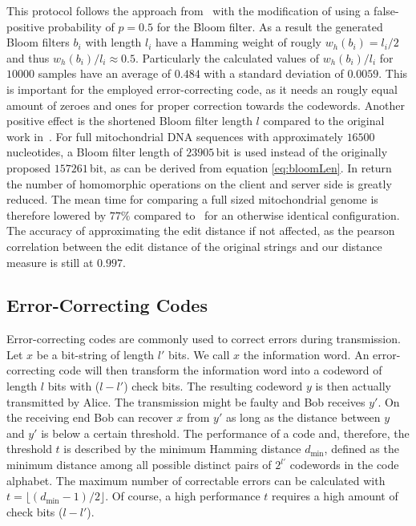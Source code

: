 \documentclass{llncs}
\begin{document}
This protocol follows the approach from~\cite{BecKer12} with the modification of using a false-positive probability of $p=0.5$ for the Bloom filter.
As a result the generated Bloom filters $b_i$ with length $l_i$ have a Hamming weight of rougly $w_h(b_i) = l_i/2$ and thus $w_h(b_i)/l_i \approx 0.5$.
Particularly the calculated values of $w_h(b_i)/l_i$ for $10000$ samples have an average of $0.484$ with a standard deviation of $0.0059$.
This is important for the employed error-correcting code, as it needs an rougly equal amount of zeroes and ones for proper correction towards the codewords.
Another positive effect is the shortened Bloom filter length $l$ compared to the original work in~\cite{BecKer12}.
For full mitochondrial DNA sequences with approximately $16500$ nucleotides, a Bloom filter length of $23905$\,bit is used instead of the originally proposed $157261$\,bit, as can be derived from equation \eqref{eq:bloomLen}.
In return the number of homomorphic operations on the client and server side is greatly reduced.
The mean time for comparing a full sized mitochondrial genome is therefore lowered by $77\%$ compared to~\cite{BecKer12} for an otherwise identical configuration.
The accuracy of approximating the edit distance if not affected, as the pearson correlation between the edit distance of the original strings and our distance measure is still at $0.997$.

\subsection{Error-Correcting Codes}
\label{sec:ecc}

Error-correcting codes are commonly used to correct errors during transmission.
Let $x$ be a bit-string of length $l'$ bits.
We call $x$ the information word. An error-correcting code will then transform the information word into a codeword of length $l$ bits with ($l - l'$) check bits.
The resulting codeword $y$ is then actually transmitted by Alice.
The transmission might be faulty and Bob receives $y'$.
On the receiving end Bob can recover $x$ from $y'$ as long as the distance between $y$ and $y'$ is below a certain threshold.
The performance of a code and, therefore, the threshold $t$ is described by the minimum Hamming distance $d_{\text{min}}$, defined as the minimum distance among all possible distinct pairs of $2^{l'}$ codewords in the code alphabet.
The maximum number of correctable errors can be calculated with $t =\lfloor(d_{\text{min}} - 1) / 2\rfloor$.
Of course, a high performance $t$ requires a high amount of check bits ($l - l'$).
\end{document}
